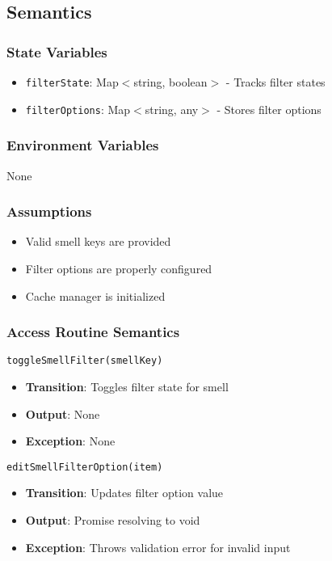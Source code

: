 \documentclass[12pt, titlepage]{article}
\begin{document}
\subsection{Semantics}

\subsubsection{State Variables}
\begin{itemize}
\item \texttt{filterState}: Map$<$string, boolean$>$ - Tracks filter states
\item \texttt{filterOptions}: Map$<$string, any$>$ - Stores filter options
\end{itemize}

\subsubsection{Environment Variables}
None

\subsubsection{Assumptions}
\begin{itemize}
\item Valid smell keys are provided
\item Filter options are properly configured
\item Cache manager is initialized
\end{itemize}

\subsubsection{Access Routine Semantics}
\texttt{toggleSmellFilter(smellKey)}
\begin{itemize}
\item \textbf{Transition}: Toggles filter state for smell
\item \textbf{Output}: None
\item \textbf{Exception}: None
\end{itemize}

\texttt{editSmellFilterOption(item)}
\begin{itemize}
\item \textbf{Transition}: Updates filter option value
\item \textbf{Output}: Promise resolving to void
\item \textbf{Exception}: Throws validation error for invalid input
\end{itemize}
\end{document}

